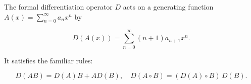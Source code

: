 The formal differentiation operator $D$ acts on a generating function $A(x) = \sum_{n=0}^{\infty} a_n x^n$ by

$$D(A(x)) = \sum_{n=0}^{\infty} (n+1) a_{n+1} x^n.$$

It satisfies the familiar rules:

$$D(AB) = D(A) B + A D(B), \quad D(A \circ B) = (D(A) \circ B) \, D(B).$$
